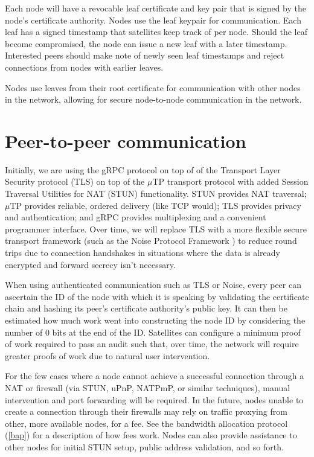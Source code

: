 \documentclass[11pt,fleqn,openany]{book}
\begin{document}
Each node will have a revocable leaf certificate and key pair that is signed by
the node's certificate authority. Nodes use the leaf keypair for
communication. Each leaf has a signed timestamp that satellites
keep track of per node. Should the leaf become compromised, the node can issue
a new leaf with a later timestamp. Interested peers should make note of newly
seen leaf timestamps and reject connections from nodes with earlier leaves.

Nodes use leaves from their root certificate for communication with other
nodes in the network, allowing for secure node-to-node communication in the network.

\section{Peer-to-peer communication}

Initially, we are using the gRPC \cite{grpc} protocol on top of of the
Transport Layer Security protocol (TLS) on top of the $\mu$TP
\cite{utp} transport protocol with added Session Traversal Utilities for NAT
(STUN) functionality. STUN provides NAT traversal; $\mu$TP provides reliable,
ordered delivery (like TCP would); TLS provides privacy and authentication;
and gRPC provides multiplexing and a convenient programmer interface.
Over time, we will replace TLS with a more flexible secure transport
framework (such as the Noise Protocol Framework \cite{noise-proto}) to
reduce round trips due to connection handshakes in situations where the data is
already encrypted and forward secrecy isn't necessary.

When using authenticated communication such as TLS or Noise, every peer can
ascertain the ID of the node with which it is
speaking by validating the certificate chain and hashing its peer's
certificate authority's public key. It can then be estimated how much work went
into constructing the node ID by considering the number of 0 bits at the end of
the ID. Satellites can configure a minimum proof of work required to pass an
audit such that, over time, the network will require greater proofs of work
due to natural user intervention.

For the few cases where a node cannot achieve a successful connection through a
NAT or firewall (via STUN, uPnP, NATPmP, or similar techniques), manual
intervention and port forwarding will be required. In the future, nodes unable
to create a connection through their firewalls may rely on traffic proxying from
other, more available nodes, for a fee. See the bandwidth allocation protocol
(\ref{bap}) for a description of how fees work. Nodes can also provide
assistance to other nodes for initial STUN setup, public address validation,
and so forth.
\end{document}
